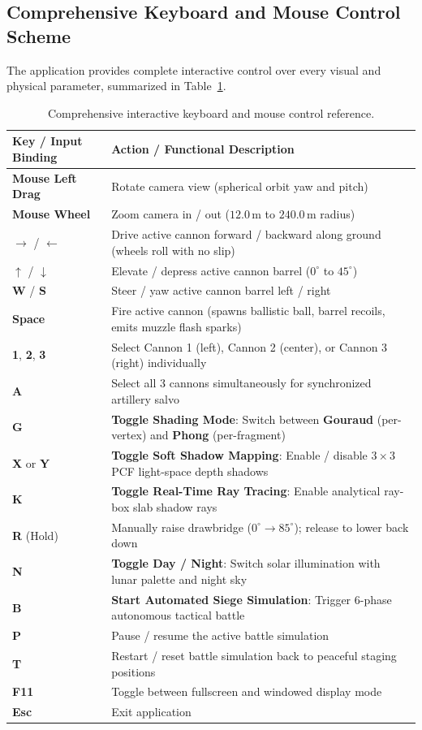 \documentclass[11pt,a4paper]{article}
\newcommand{\key}[1]{\textsf{\small\textbf{#1}}}
\begin{document}
\subsection{Comprehensive Keyboard and Mouse Control Scheme}
The application provides complete interactive control over every visual and physical parameter, summarized in Table~\ref{tab:controls}.

\begin{table}[H]
\centering\small
\begin{tabular}{@{}ll@{}}
\toprule
\textbf{Key / Input Binding} & \textbf{Action / Functional Description} \\
\midrule
\key{Mouse Left Drag} & Rotate camera view (spherical orbit yaw and pitch) \\
\key{Mouse Wheel} & Zoom camera in / out ($12.0\,\text{m}$ to $240.0\,\text{m}$ radius) \\
\key{$\rightarrow$} / \key{$\leftarrow$} & Drive active cannon forward / backward along ground (wheels roll with no slip) \\
\key{$\uparrow$} / \key{$\downarrow$} & Elevate / depress active cannon barrel ($0^\circ$ to $45^\circ$) \\
\key{W} / \key{S} & Steer / yaw active cannon barrel left / right \\
\key{Space} & Fire active cannon (spawns ballistic ball, barrel recoils, emits muzzle flash sparks) \\
\key{1}, \key{2}, \key{3} & Select Cannon 1 (left), Cannon 2 (center), or Cannon 3 (right) individually \\
\key{A} & Select all 3 cannons simultaneously for synchronized artillery salvo \\
\key{G} & \textbf{Toggle Shading Mode}: Switch between \textbf{Gouraud} (per-vertex) and \textbf{Phong} (per-fragment) \\
\key{X} or \key{Y} & \textbf{Toggle Soft Shadow Mapping}: Enable / disable $3 \times 3$ PCF light-space depth shadows \\
\key{K} & \textbf{Toggle Real-Time Ray Tracing}: Enable analytical ray-box slab shadow rays \\
\key{R} (Hold) & Manually raise drawbridge ($0^\circ \to 85^\circ$); release to lower back down \\
\key{N} & \textbf{Toggle Day / Night}: Switch solar illumination with lunar palette and night sky \\
\key{B} & \textbf{Start Automated Siege Simulation}: Trigger 6-phase autonomous tactical battle \\
\key{P} & Pause / resume the active battle simulation \\
\key{T} & Restart / reset battle simulation back to peaceful staging positions \\
\key{F11} & Toggle between fullscreen and windowed display mode \\
\key{Esc} & Exit application \\
\bottomrule
\end{tabular}
\caption{Comprehensive interactive keyboard and mouse control reference.}
\label{tab:controls}
\end{table}
\end{document}
